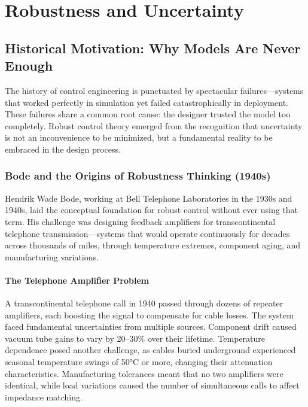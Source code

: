 
\chapter{Robustness and Uncertainty}
\label{ch:robustness}


\section{Historical Motivation: Why Models Are Never Enough}
\label{sec:robustness_history}

The history of control engineering is punctuated by spectacular failures---systems that worked perfectly in simulation yet failed catastrophically in deployment. These failures share a common root cause: the designer trusted the model too completely. Robust control theory emerged from the recognition that uncertainty is not an inconvenience to be minimized, but a fundamental reality to be embraced in the design process.

\subsection{Bode and the Origins of Robustness Thinking (1940s)}
\label{subsec:bode}

Hendrik Wade Bode, working at Bell Telephone Laboratories in the 1930s and 1940s, laid the conceptual foundation for robust control without ever using that term. His challenge was designing feedback amplifiers for transcontinental telephone transmission---systems that would operate continuously for decades across thousands of miles, through temperature extremes, component aging, and manufacturing variations.

\subsubsection{The Telephone Amplifier Problem}

A transcontinental telephone call in 1940 passed through dozens of repeater amplifiers, each boosting the signal to compensate for cable losses. The system faced fundamental uncertainties from multiple sources. Component drift caused vacuum tube gains to vary by 20--30\% over their lifetime. Temperature dependence posed another challenge, as cables buried underground experienced seasonal temperature swings of 50°C or more, changing their attenuation characteristics. Manufacturing tolerances meant that no two amplifiers were identical, while load variations caused the number of simultaneous calls to affect impedance matching.

